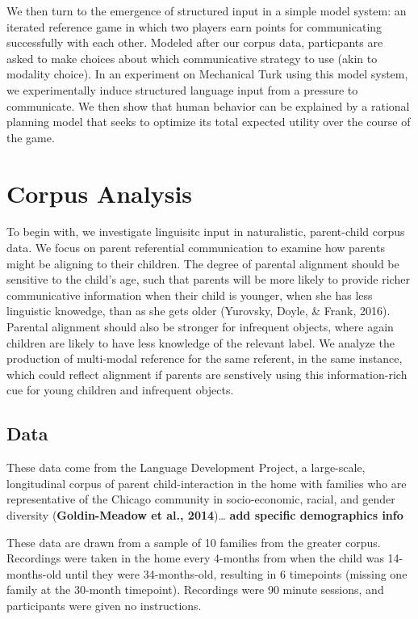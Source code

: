 \documentclass[10pt, letterpaper]{article}
\begin{document}
We then turn to the emergence of structured input in a simple model
system: an iterated reference game in which two players earn points for
communicating successfully with each other. Modeled after our corpus
data, particpants are asked to make choices about which communicative
strategy to use (akin to modality choice). In an experiment on
Mechanical Turk using this model system, we experimentally induce
structured language input from a pressure to communicate. We then show
that human behavior can be explained by a rational planning model that
seeks to optimize its total expected utility over the course of the
game.

\hypertarget{corpus-analysis}{%
\section{Corpus Analysis}\label{corpus-analysis}}

To begin with, we investigate linguisitc input in naturalistic,
parent-child corpus data. We focus on parent referential communication
to examine how parents might be aligning to their children. The degree
of parental alignment should be sensitive to the child's age, such that
parents will be more likely to provide richer communicative information
when their child is younger, when she has less linguistic knowedge, than
as she gets older (Yurovsky, Doyle, \& Frank, 2016). Parental alignment
should also be stronger for infrequent objects, where again children are
likely to have less knowledge of the relevant label. We analyze the
production of multi-modal reference for the same referent, in the same
instance, which could reflect alignment if parents are senstively using
this information-rich cue for young children and infrequent objects.

\hypertarget{data}{%
\subsection{Data}\label{data}}

These data come from the Language Development Project, a large-scale,
longitudinal corpus of parent child-interaction in the home with
families who are representative of the Chicago community in
socio-economic, racial, and gender diversity (\textbf{Goldin-Meadow et
al., 2014})\ldots{} \textbf{add specific demographics info}

These data are drawn from a sample of 10 families from the greater
corpus. Recordings were taken in the home every 4-months from when the
child was 14-months-old until they were 34-months-old, resulting in 6
timepoints (missing one family at the 30-month timepoint). Recordings
were 90 minute sessions, and participants were given no instructions.
\end{document}
